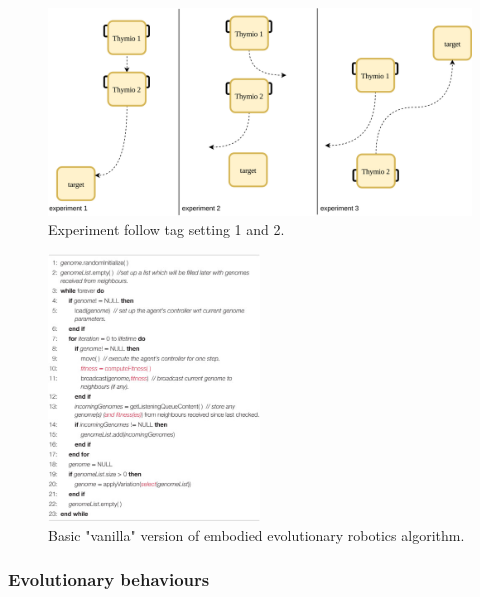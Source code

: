 \documentclass[a4paper]{report}
\begin{document}
\begin{figure}[H]
    \centering
    \includegraphics[width=1.0\textwidth]{experiment.png}
    \caption{Experiment follow tag setting 1 and 2.}
    \label{fig:folltg}
\end{figure}

\begin{figure}
    \centering
    \includegraphics[width=0.5\textwidth]{imgalg.jpg}
    \caption{Basic "vanilla" version of embodied evolutionary robotics algorithm\cite{Rob1}.}
    \label{fig:eeal}
\end{figure}

\subsubsection{Evolutionary behaviours}
\end{document}
